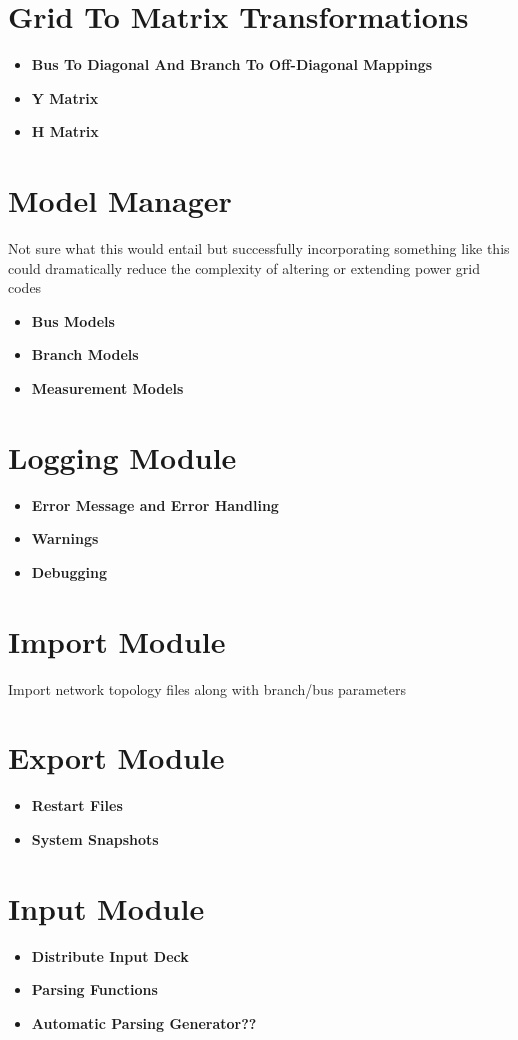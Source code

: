 \documentclass[12pt]{article}
\begin{document}
\section{Grid To Matrix Transformations}
\begin{itemize}
\item{\bf Bus To Diagonal And Branch To Off-Diagonal Mappings}
\item{\bf Y Matrix}
\item{\bf H Matrix}
\end{itemize}

\section{Model Manager}
Not sure what this would entail but successfully incorporating something like
this could dramatically reduce the complexity of altering or extending power
grid codes
\begin{itemize}
\item{\bf Bus Models}
\item{\bf Branch Models}
\item{\bf Measurement Models}
\end{itemize}

\section{Logging Module}
\begin{itemize}
\item{\bf Error Message and Error Handling}
\item{\bf Warnings}
\item{\bf Debugging}
\end{itemize}

\section{Import Module}
Import network topology files along with branch/bus parameters

\section{Export Module}
\begin{itemize}
\item{\bf Restart Files}
\item{\bf System Snapshots}
\end{itemize}

\section{Input Module}
\begin{itemize}
\item{\bf Distribute Input Deck}
\item{\bf Parsing Functions}
\item{\bf Automatic Parsing Generator??}
\end{itemize}
\end{document}
